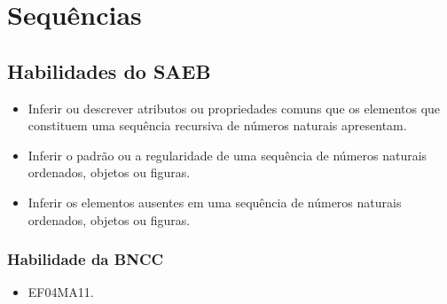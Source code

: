 \chapter{Sequências}

\section*{Habilidades do SAEB}

\begin{itemize}
\item Inferir ou descrever atributos ou propriedades comuns que os elementos
que constituem uma sequência recursiva de números naturais apresentam.

\item Inferir o padrão ou a regularidade de uma sequência de números
naturais ordenados, objetos ou figuras.

\item Inferir os elementos ausentes em uma sequência de números naturais
ordenados, objetos ou figuras.
\end{itemize}

\subsection{Habilidade da BNCC}

\begin{itemize}
\item EF04MA11.
\end{itemize}

